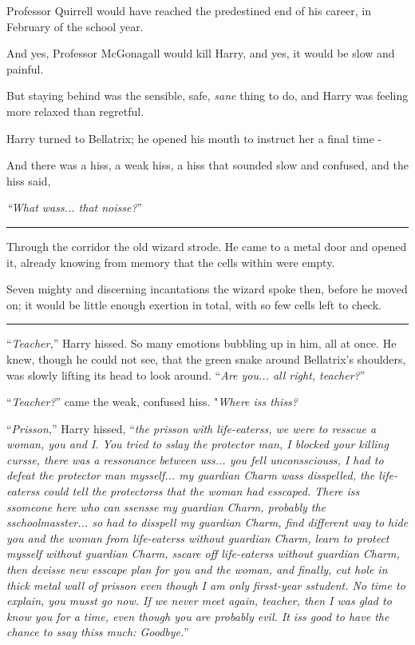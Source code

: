 Professor Quirrell would have reached the predestined end of his career, in February of the school year.

And yes, Professor McGonagall would kill Harry, and yes, it would be slow and painful.

But staying behind was the sensible, safe, \emph{sane} thing to do, and Harry was feeling more relaxed than regretful.

Harry turned to Bellatrix; he opened his mouth to instruct her a final time -

And there was a hiss, a weak hiss, a hiss that sounded slow and confused, and the hiss said,

\emph{``What wass... that noisse?}''

\begin{center}\rule{3in}{0.4pt}\end{center}

Through the corridor the old wizard strode. He came to a metal door and opened it, already knowing from memory that the cells within were empty.

Seven mighty and discerning incantations the wizard spoke then, before he moved on; it would be little enough exertion in total, with so few cells left to check.

\begin{center}\rule{3in}{0.4pt}\end{center}

``\emph{Teacher,}'' Harry hissed. So many emotions bubbling up in him, all at once. He knew, though he could not see, that the green snake around Bellatrix's shoulders, was slowly lifting its head to look around. ``\emph{Are you... all right, teacher?}''

``\emph{Teacher?}'' came the weak, confused hiss. "\emph{Where iss thiss?}

``\emph{Prisson,}'' Harry hissed, ``\emph{the prisson with life-eaterss, we were to resscue a woman, you and I. You tried to sslay the protector man, I blocked your killing cursse, there was a ressonance between uss... you fell unconssciouss, I had to defeat the protector man mysself... my guardian Charm wass disspelled, the life-eaterss could tell the protectorss that the woman had esscaped. There iss ssomeone here who can ssensse my guardian Charm, probably the sschoolmasster... so had to disspell my guardian Charm, find different way to hide you and the woman from life-eaterss without guardian Charm, learn to protect mysself without guardian Charm, sscare off life-eaterss without guardian Charm, then devisse new esscape plan for you and the woman, and finally, cut hole in thick metal wall of prisson even though I am only firsst-year sstudent. No time to explain, you musst go now. If we never meet again, teacher, then I was glad to know you for a time, even though you are probably evil. It iss good to have the chance to ssay thiss much: Goodbye.}''

